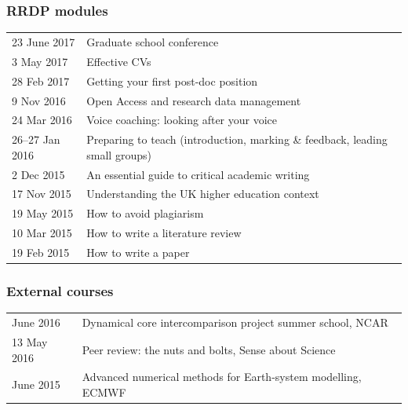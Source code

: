 \documentclass[a4paper,11pt]{article}
\begin{document}
\subsubsection*{RRDP modules}
\begin{tabular}{l l}
23 June 2017    & Graduate school conference \\
3 May 2017	& Effective CVs \\
28 Feb 2017	& Getting your first post-doc position \\
9 Nov 2016      & Open Access and research data management \\
24 Mar 2016	& Voice coaching: looking after your voice \\
26--27 Jan 2016 & Preparing to teach (introduction, marking \& feedback, leading small groups) \\
2 Dec 2015	& An essential guide to critical academic writing \\
17 Nov 2015	& Understanding the UK higher education context \\
19 May 2015	& How to avoid plagiarism \\
10 Mar 2015	& How to write a literature review \\
19 Feb 2015	& How to write a paper \\
\end{tabular}

\subsubsection*{External courses}
\begin{tabular}{l l}
June 2016 & Dynamical core intercomparison project summer school, NCAR \\
13 May 2016 & Peer review: the nuts and bolts, Sense about Science \\
June 2015 & Advanced numerical methods for Earth-system modelling, ECMWF \\
\end{tabular}
\end{document}
